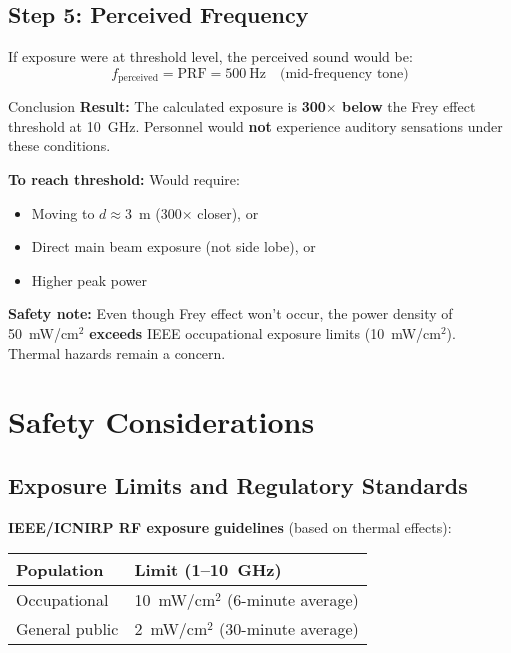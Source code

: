 \subsection*{Step 5: Perceived Frequency}

If exposure were at threshold level, the perceived sound would be:
\begin{equation}
f_{\text{perceived}} = \text{PRF} = 500~\text{Hz} \quad \text{(mid-frequency tone)}
\end{equation}

\begin{calloutbox}[colback=black!8!white,colframe=black]{Conclusion}
\textbf{Result:} The calculated exposure is \textbf{300$\times$ below} the Frey effect threshold at 10~GHz. Personnel would \textbf{not} experience auditory sensations under these conditions.

\textbf{To reach threshold:} Would require:
\begin{itemize}
\item Moving to $d \approx 3$~m (300$\times$ closer), or
\item Direct main beam exposure (not side lobe), or
\item Higher peak power
\end{itemize}

\textbf{Safety note:} Even though Frey effect won't occur, the power density of 50~mW/cm$^2$ \textbf{exceeds} IEEE occupational exposure limits (10~mW/cm$^2$). Thermal hazards remain a concern.
\end{calloutbox}

\section{Safety Considerations}
\label{sec:frey-safety}

\subsection{Exposure Limits and Regulatory Standards}

\textbf{IEEE/ICNIRP RF exposure guidelines} (based on thermal effects):

\begin{center}
\begin{tabular}{@{}ll@{}}
\toprule
\textbf{Population} & \textbf{Limit (1--10~GHz)} \\
\midrule
Occupational & 10~mW/cm$^2$ (6-minute average) \\
General public & 2~mW/cm$^2$ (30-minute average) \\
\bottomrule
\end{tabular}
\end{center}

